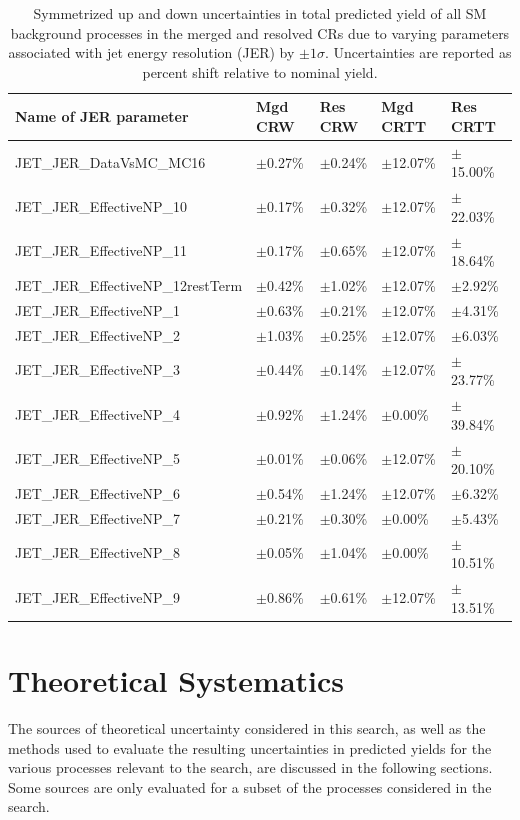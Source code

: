 \begin{table}[ht]
\caption{\label{tab:systs_total_bkg_JET_JER_CR} Symmetrized up and down uncertainties in total predicted yield of all SM background processes in the merged and resolved CRs due to varying parameters associated with jet energy resolution (JER) by \(\pm1\sigma\). Uncertainties are reported as percent shift relative to nominal yield.}
\footnotesize{
\begin{tabular}{l l l l l }
\toprule
\textbf{Name of JER parameter} & \textbf{Mgd CRW} & \textbf{Res CRW} & \textbf{Mgd CRTT} & \textbf{Res CRTT}\tabularnewline
\midrule
\midrule
JET\_JER\_DataVsMC\_MC16 & \(\pm\)0.27\% &\(\pm\)0.24\% &\(\pm\)12.07\% &\(\pm\)15.00\% \tabularnewline
\midrule
JET\_JER\_EffectiveNP\_10 & \(\pm\)0.17\% &\(\pm\)0.32\% &\(\pm\)12.07\% &\(\pm\)22.03\% \tabularnewline
\midrule
JET\_JER\_EffectiveNP\_11 & \(\pm\)0.17\% &\(\pm\)0.65\% &\(\pm\)12.07\% &\(\pm\)18.64\% \tabularnewline
\midrule
JET\_JER\_EffectiveNP\_12restTerm & \(\pm\)0.42\% &\(\pm\)1.02\% &\(\pm\)12.07\% &\(\pm\)2.92\% \tabularnewline
\midrule
JET\_JER\_EffectiveNP\_1 & \(\pm\)0.63\% &\(\pm\)0.21\% &\(\pm\)12.07\% &\(\pm\)4.31\% \tabularnewline
\midrule
JET\_JER\_EffectiveNP\_2 & \(\pm\)1.03\% &\(\pm\)0.25\% &\(\pm\)12.07\% &\(\pm\)6.03\% \tabularnewline
\midrule
JET\_JER\_EffectiveNP\_3 & \(\pm\)0.44\% &\(\pm\)0.14\% &\(\pm\)12.07\% &\(\pm\)23.77\% \tabularnewline
\midrule
JET\_JER\_EffectiveNP\_4 & \(\pm\)0.92\% &\(\pm\)1.24\% &\(\pm\)0.00\% &\(\pm\)39.84\% \tabularnewline
\midrule
JET\_JER\_EffectiveNP\_5 & \(\pm\)0.01\% &\(\pm\)0.06\% &\(\pm\)12.07\% &\(\pm\)20.10\% \tabularnewline
\midrule
JET\_JER\_EffectiveNP\_6 & \(\pm\)0.54\% &\(\pm\)1.24\% &\(\pm\)12.07\% &\(\pm\)6.32\% \tabularnewline
\midrule
JET\_JER\_EffectiveNP\_7 & \(\pm\)0.21\% &\(\pm\)0.30\% &\(\pm\)0.00\% &\(\pm\)5.43\% \tabularnewline
\midrule
JET\_JER\_EffectiveNP\_8 & \(\pm\)0.05\% &\(\pm\)1.04\% &\(\pm\)0.00\% &\(\pm\)10.51\% \tabularnewline
\midrule
JET\_JER\_EffectiveNP\_9 & \(\pm\)0.86\% &\(\pm\)0.61\% &\(\pm\)12.07\% &\(\pm\)13.51\% \tabularnewline
\bottomrule
\end{tabular}}
\end{table}

\section{Theoretical Systematics}

The sources of theoretical uncertainty considered in this search, as well as the methods used to evaluate the resulting uncertainties in predicted yields for the various processes relevant to the search, are discussed in the following sections. Some sources are only evaluated for a subset of the processes considered in the search.

